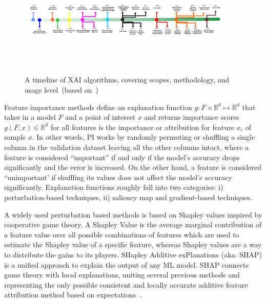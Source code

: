 \begin{figure}
	\centering
	\includegraphics[width=0.9\textwidth,height=55mm]{images/xai_roadmap.png}	
    \caption{A timeline of XAI algorithms, covering scopes, methodology, and usage level~(based on~\cite{das2020opportunities})}	
	\label{fig:xai_timeline}
\end{figure}

\hspace*{3.5mm} Feature importance methods define an explanation function $g: F \times \mathbb{R}^{d} \mapsto \mathbb{R}^{d}$ that takes in a model $F$ and a point of interest $x$ and returns importance scores $g(F,x) \in \mathbb{R}^{d}$ for all features is the importance or attribution for feature $x_i$ of sample $x$. In other words, PI works by randomly permuting or shuffling a single column in the validation dataset leaving all the other columns intact, where a feature is considered ``important” if and only if the model's accuracy drops significantly and the error is increased. On the other hand, a feature is considered ``unimportant’ if shuffling its values does not affect the model's accuracy significantly. Explanation functions roughly fall into two categories: i) perturbation-based techniques, ii) saliency map and gradient-based techniques. 

\hspace*{3.5mm} A widely used perturbation based methods is based on Shapley values inspired by cooperative game theory. A Shapley Value is the average marginal contribution of a feature value over all possible combinations of features which are used to estimate the Shapley value of a specific feature, whereas Shapley values are a way to distribute the gains to its players. SHapley Additive exPlanations (aka. SHAP) is a unified approach to explain the output of any ML model. SHAP connects game theory with local explanations, uniting several previous methods and representing the only possible consistent and locally accurate additive feature attribution method based on expectations~\cite{NIPS2017_7062}. 

